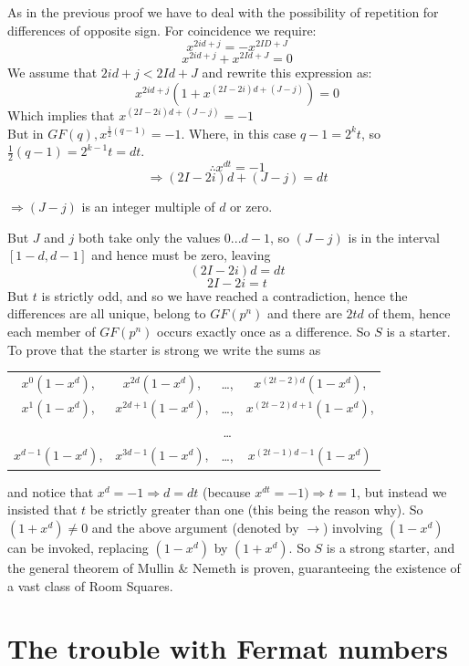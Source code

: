 \documentclass[
  12pt,
  a4paper]{book}
\begin{document}
As in the previous proof we have to deal with the possibility of
repetition for differences of opposite sign. For coincidence we require:
\[x^{2id+j}=-x^{2ID+J}\] \[x^{2id+j}+x^{2Id+J}=0\] We assume that
\(2id+j<2Id+J\) and rewrite this expression as:
\[x^{2id+j}(1+x^{(2I-2i)d+(J-j)})=0\] Which implies that
\(x^{(2I-2i)d+(J-j)}=-1\)\\
But in \(GF(q),x^{\frac{1}{2}(q-1)}=-1\). Where, in this case \(q-1=2^kt\),
so \(\frac{1}{2}(q-1)=2^{k-1}t=dt\). \[\therefore x^{dt} = -1\]
\[\Rightarrow (2I-2i)d+(J-j)=dt\]

\(\Rightarrow (J-j)\) is an integer multiple of \(d\) or zero.

But \(J\) and \(j\) both take only the values \(0...d-1\), so \((J-j)\) is in
the interval \([1-d,d-1]\) and hence must be zero, leaving \[(2I-2i)d=dt\]
\[2I-2i=t\] But \(t\) is strictly odd, and so we have reached a
contradiction, hence the differences are all unique, belong to \(GF(p^n)\)
and there are \(2td\) of them, hence each member of \(GF(p^n)\) occurs
exactly once as a difference. So \(S\) is a starter.\\
To prove that the starter is strong we write the sums as

\begin{longtable}[]{@{}cccc@{}}
\toprule
\endhead
\(x^0(1-x^d)\), & \(x^{2d}(1-x^d)\), & \ldots, & \(x^{(2t-2)d}(1-x^d)\),\tabularnewline
\(x^1(1-x^d)\), & \(x^{2d+1}(1-x^d)\), & \ldots, & \(x^{(2t-2)d+1}(1-x^d)\),\tabularnewline
& & \ldots{} &\tabularnewline
\(x^{d-1}(1-x^d)\), & \(x^{3d-1}(1-x^d)\), & \ldots, & \(x^{(2t-1)d-1}(1-x^d)\)\tabularnewline
\bottomrule
\end{longtable}

and notice that \(x^d=-1 \Rightarrow d=dt\) (because
\(x^{dt}=-1) \Rightarrow t=1\), but instead we insisted that \(t\) be
strictly greater than one (this being the reason why). So
\((1+x^d) \neq 0\) and the above argument (denoted by \(\rightarrow\))
involving \((1-x^d)\) can be invoked, replacing \((1-x^d)\) by \((1+x^d)\). So
\(S\) is a strong starter, and the general theorem of Mullin \& Nemeth is
proven, guaranteeing the existence of a vast class of Room Squares.

\hypertarget{the-trouble-with-fermat-numbers}{%
\section{The trouble with Fermat numbers}\label{the-trouble-with-fermat-numbers}}
\end{document}
